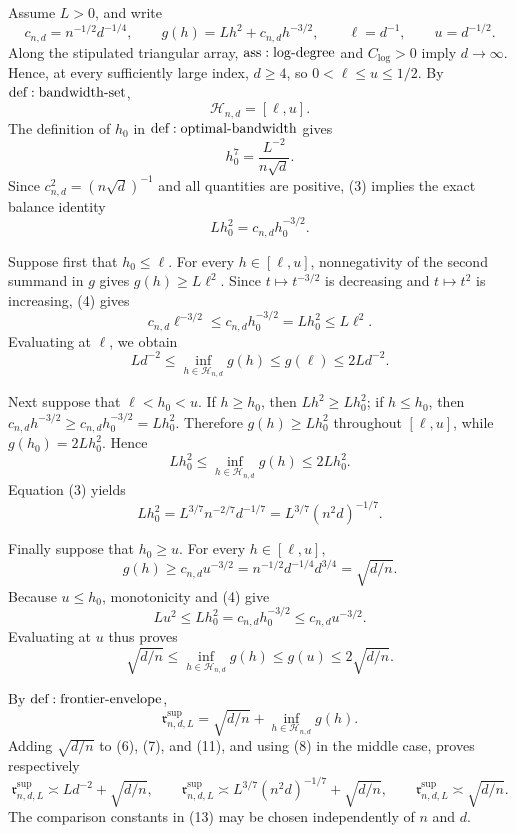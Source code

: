 Assume \(L>0\), and write
\[
 c_{n,d}=n^{-1/2}d^{-1/4},
 \qquad g(h)=Lh^2+c_{n,d}h^{-3/2},
 \qquad \ell=d^{-1},
 \qquad u=d^{-1/2}.
\tag{1}
\]
Along the stipulated triangular array, \({\rm ass:log\text{-}degree}\) and \(C_{\log}>0\) imply \(d\to\infty\).  Hence, at every sufficiently large index, \(d\geq4\), so \(0<\ell\leq u\leq1/2\).  By \({\rm def:bandwidth\text{-}set}\),
\[
 \mathcal H_{n,d}=[\ell,u].
\tag{2}
\]
The definition of \(h_0\) in \({\rm def:optimal\text{-}bandwidth}\) gives
\[
 h_0^7=\frac{L^{-2}}{n\sqrt d}.
\tag{3}
\]
Since \(c_{n,d}^2=(n\sqrt d)^{-1}\) and all quantities are positive, (3) implies the exact balance identity
\[
 Lh_0^2=c_{n,d}h_0^{-3/2}.
\tag{4}
\]

Suppose first that \(h_0\leq\ell\).  For every \(h\in[\ell,u]\), nonnegativity of the second summand in \(g\) gives \(g(h)\geq L\ell^2\).  Since \(t\mapsto t^{-3/2}\) is decreasing and \(t\mapsto t^2\) is increasing, (4) gives
\[
 c_{n,d}\ell^{-3/2}
 \leq c_{n,d}h_0^{-3/2}
 =Lh_0^2
 \leq L\ell^2.
\tag{5}
\]
Evaluating at \(\ell\), we obtain
\[
 Ld^{-2}
 \leq\inf_{h\in\mathcal H_{n,d}}g(h)
 \leq g(\ell)
 \leq2Ld^{-2}.
\tag{6}
\]

Next suppose that \(\ell<h_0<u\).  If \(h\geq h_0\), then \(Lh^2\geq Lh_0^2\); if \(h\leq h_0\), then \(c_{n,d}h^{-3/2}\geq c_{n,d}h_0^{-3/2}=Lh_0^2\).  Therefore \(g(h)\geq Lh_0^2\) throughout \([\ell,u]\), while \(g(h_0)=2Lh_0^2\).  Hence
\[
 Lh_0^2
 \leq\inf_{h\in\mathcal H_{n,d}}g(h)
 \leq2Lh_0^2.
\tag{7}
\]
Equation (3) yields
\[
 Lh_0^2=L^{3/7}n^{-2/7}d^{-1/7}
 =L^{3/7}(n^2d)^{-1/7}.
\tag{8}
\]

Finally suppose that \(h_0\geq u\).  For every \(h\in[\ell,u]\),
\[
 g(h)\geq c_{n,d}u^{-3/2}
 =n^{-1/2}d^{-1/4}d^{3/4}
 =\sqrt{d/n}.
\tag{9}
\]
Because \(u\leq h_0\), monotonicity and (4) give
\[
 Lu^2\leq Lh_0^2=c_{n,d}h_0^{-3/2}
 \leq c_{n,d}u^{-3/2}.
\tag{10}
\]
Evaluating at \(u\) thus proves
\[
 \sqrt{d/n}
 \leq\inf_{h\in\mathcal H_{n,d}}g(h)
 \leq g(u)
 \leq2\sqrt{d/n}.
\tag{11}
\]

By \({\rm def:frontier\text{-}envelope}\),
\[
 \mathfrak r^{\mathrm{sup}}_{n,d,L}
 =\sqrt{d/n}+\inf_{h\in\mathcal H_{n,d}}g(h).
\tag{12}
\]
Adding \(\sqrt{d/n}\) to (6), (7), and (11), and using (8) in the middle case, proves respectively
\[
 \mathfrak r^{\mathrm{sup}}_{n,d,L}
 \asymp Ld^{-2}+\sqrt{d/n},
 \qquad
 \mathfrak r^{\mathrm{sup}}_{n,d,L}
 \asymp L^{3/7}(n^2d)^{-1/7}+\sqrt{d/n},
 \qquad
 \mathfrak r^{\mathrm{sup}}_{n,d,L}\asymp\sqrt{d/n}.
\tag{13}
\]
The comparison constants in (13) may be chosen independently of \(n\) and \(d\).

